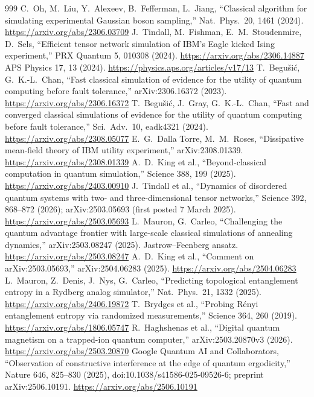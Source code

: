 \documentclass[10pt,a4paper]{article}
\begin{document}
\begin{thebibliography}{999}
 C.~Oh, M.~Liu, Y.~Alexeev, B.~Fefferman, L.~Jiang, ``Classical algorithm for simulating experimental Gaussian boson sampling,'' Nat.\ Phys.\ 20, 1461 (2024). \url{https://arxiv.org/abs/2306.03709}
 J.~Tindall, M.~Fishman, E.~M.~Stoudenmire, D.~Sels, ``Efficient tensor network simulation of IBM's Eagle kicked Ising experiment,'' PRX Quantum 5, 010308 (2024). \url{https://arxiv.org/abs/2306.14887}
 APS Physics 17, 13 (2024). \url{https://physics.aps.org/articles/v17/13}
 T.~Begu\v{s}i\'c, G.~K.-L.~Chan, ``Fast classical simulation of evidence for the utility of quantum computing before fault tolerance,'' arXiv:2306.16372 (2023). \url{https://arxiv.org/abs/2306.16372}
 T.~Begu\v{s}i\'c, J.~Gray, G.~K.-L.~Chan, ``Fast and converged classical simulations of evidence for the utility of quantum computing before fault tolerance,'' Sci.\ Adv.\ 10, eadk4321 (2024). \url{https://arxiv.org/abs/2308.05077}
 E.~G.~Dalla Torre, M.~M.~Roses, ``Dissipative mean-field theory of IBM utility experiment,'' arXiv:2308.01339. \url{https://arxiv.org/abs/2308.01339}
 A.~D.~King et al., ``Beyond-classical computation in quantum simulation,'' Science 388, 199 (2025). \url{https://arxiv.org/abs/2403.00910}
 J.~Tindall et al., ``Dynamics of disordered quantum systems with two- and three-dimensional tensor networks,'' Science 392, 868--872 (2026); arXiv:2503.05693 (first posted 7 March 2025). \url{https://arxiv.org/abs/2503.05693}
 L.~Mauron, G.~Carleo, ``Challenging the quantum advantage frontier with large-scale classical simulations of annealing dynamics,'' arXiv:2503.08247 (2025). Jastrow--Feenberg ansatz. \url{https://arxiv.org/abs/2503.08247}
 A.~D.~King et al., ``Comment on arXiv:2503.05693,'' arXiv:2504.06283 (2025). \url{https://arxiv.org/abs/2504.06283}
 L.~Mauron, Z.~Denis, J.~Nys, G.~Carleo, ``Predicting topological entanglement entropy in a Rydberg analog simulator,'' Nat.\ Phys.\ 21, 1332 (2025). \url{https://arxiv.org/abs/2406.19872}
 T.~Brydges et al., ``Probing R\'enyi entanglement entropy via randomized measurements,'' Science 364, 260 (2019). \url{https://arxiv.org/abs/1806.05747}
 R.~Haghshenas et al., ``Digital quantum magnetism on a trapped-ion quantum computer,'' arXiv:2503.20870v3 (2026). \url{https://arxiv.org/abs/2503.20870}
 Google Quantum AI and Collaborators, ``Observation of constructive interference at the edge of quantum ergodicity,'' Nature 646, 825--830 (2025), doi:10.1038/s41586-025-09526-6; preprint arXiv:2506.10191. \url{https://arxiv.org/abs/2506.10191}

\end{thebibliography}
\end{document}
